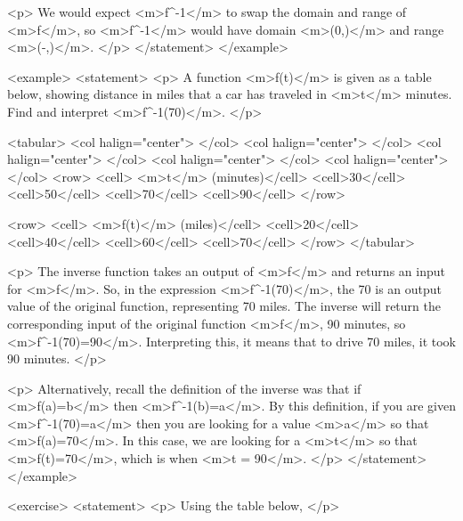                 <p>
                    We would expect <m>f^{-1}</m> to swap the domain and range of <m>f</m>, so <m>f^{-1}</m> would have domain <m>(0,\infty)</m> and range <m>(-\infty,\infty)</m>.
                </p>
            </statement>
        </example>

        <example>
            <statement>
                <p>
                    A function <m>f(t)</m> is given as a table below, showing distance in miles that a car has traveled in <m>t</m> minutes.
                    Find and interpret <m>f^{-1}(70)</m>.
                </p>

                <tabular>
                    <col halign="center"> </col> <col halign="center"> </col> <col halign="center"> </col> <col halign="center"> </col> <col halign="center"> </col>
                    <row>
                        <cell> <m>t</m> (minutes)</cell>
                        <cell>30</cell>
                        <cell>50</cell>
                        <cell>70</cell>
                        <cell>90</cell>
                    </row>

                    <row>
                        <cell> <m>f(t)</m> (miles)</cell>
                        <cell>20</cell>
                        <cell>40</cell>
                        <cell>60</cell>
                        <cell>70</cell>
                    </row>
                </tabular>

                <p>
                    The inverse function takes an output of <m>f</m> and returns an input for <m>f</m>.
                    So, in the expression <m>f^{-1}(70)</m>, the 70 is an output value of the original function, representing 70 miles.
                    The inverse will return the corresponding input of the original function <m>f</m>, 90 minutes, so <m>f^{-1}(70)=90</m>.
                    Interpreting this, it means that to drive 70 miles, it took 90 minutes.
                </p>

                <p>
                    Alternatively, recall the definition of the inverse was that if <m>f(a)=b</m> then <m>f^{-1}(b)=a</m>.
                    By this definition, if you are given <m>f^{-1}(70)=a</m> then you are looking for a value <m>a</m> so that <m>f(a)=70</m>.
                    In this case, we are looking for a <m>t</m> so that <m>f(t)=70</m>, which is when <m>t = 90</m>.
                </p>
            </statement>
        </example>

        <exercise>
            <statement>
                <p>
                    Using the table below,
                </p>

